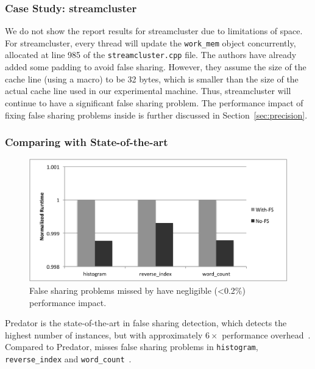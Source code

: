 \subsubsection{Case Study: streamcluster}

We do not show the report results for streamcluster due to limitations of space. For streamcluster, every thread will update the \texttt{work\_mem} object concurrently, allocated at line 985 of the \texttt{streamcluster.cpp} file. The authors have already added some padding to avoid false sharing. However, they assume the size of the cache line (using a macro) to be 32 bytes, which is smaller than the size of the actual cache line used in our experimental machine. Thus, streamcluster will continue to have a significant false sharing problem. The performance impact of fixing false sharing problems inside is further discussed in Section~\ref{sec:precision}. 


\subsubsection{Comparing with State-of-the-art}

\begin{figure}[htbp]
\centering
\includegraphics[width=1\columnwidth]{figure/trivial.pdf}
\caption{False sharing problems missed by \cheetah{} have negligible (<0.2\%) performance impact. \label{fig:fseffectiveness}}
\end{figure}

Predator is the state-of-the-art in false sharing detection, which detects the highest number of instances, but with approximately $6\times$ performance overhead~\cite{Predator}. Compared to Predator, \cheetah{} misses false sharing problems in \texttt{histogram}, \texttt{reverse\_index} and \texttt{word\_count}~\cite{Predator}. 

